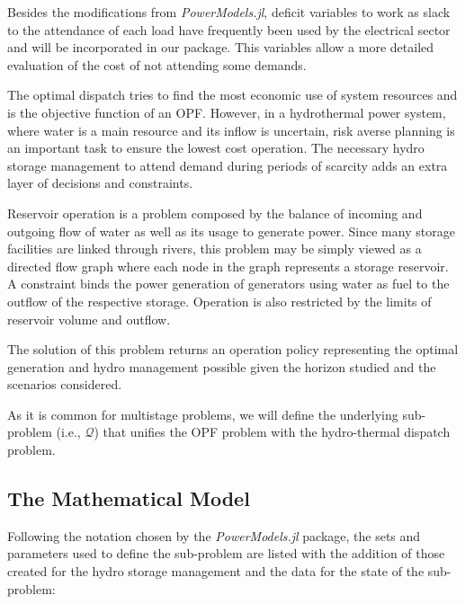 \documentclass{juliacon}
\begin{document}
Besides the modifications from \textit{PowerModels.jl}, deficit variables to work as slack to the attendance of each load have frequently been used by the electrical sector and will be incorporated in our package. This variables allow a more detailed evaluation of the cost of not attending some demands. 

The optimal dispatch tries to find the most economic use of system resources and is the objective function of an OPF. However, in a hydrothermal power system, where water is a main resource and its inflow is uncertain, risk averse planning is an important task to ensure the lowest cost operation. The necessary hydro storage management to attend demand during periods of scarcity adds an extra layer of decisions and constraints.

Reservoir operation is a problem composed by the balance of incoming and outgoing flow of water as well as its usage to generate power. Since many storage facilities are linked through rivers, this problem may be simply viewed as a directed flow graph where each node in the graph represents a storage reservoir. A constraint binds the power generation of generators using water as fuel to the outflow of the respective storage. Operation is also restricted by the limits of reservoir volume and outflow.

The solution of this problem returns an operation policy representing the optimal generation and hydro management possible given the horizon studied and the scenarios considered.

As it is common for multistage problems, we will define the underlying sub-problem (i.e., $\mathcal{Q}$) that unifies the OPF problem with the hydro-thermal dispatch problem.

\subsection{The Mathematical Model}
\label{subsub:mathmodel}

Following the notation chosen by the \textit{PowerModels.jl} package, the sets and parameters used to define the sub-problem are listed with the addition of those created for the hydro storage management and the data for the state of the sub-problem:
\end{document}
